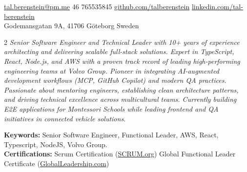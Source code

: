 \documentclass[10pt,a4paper]{article}
\begin{document}
\sloppy  %



\nobreakvspace{0.3em}  %

\noindent\href{mailto:tal.berenstein@pm.me}{tal.berenstein\mbox{}@\mbox{}pm.me}\sbull
\textsmaller{+}46 765535845\sbull
\href{https://github.com/talberenstein}{github.com/talberenstein}\sbull
\href{https://www.linkedin.com/in/tali-berenstein-torres-94055726b/}{linkedin.com/tal-berenstein}
\\
Godemansgatan 9A,
41706\thinspace {\large \sc }\sbull
Göteborg\sbull
Sweden

\spacedhrule{0.9em}{-0.4em}  %


\vspace{-1.3em}  %
\begin{multicols}{2}  %
\noindent
\emph{Senior Software Engineer and Technical Leader with 10+ years of experience architecting and delivering scalable full-stack solutions. Expert in TypeScript, React, Node.js, and AWS with a proven track record of leading high-performing engineering teams at Volvo Group. Pioneer in integrating AI-augmented development workflows (MCP, GitHub Copilot) and modern QA practices. Passionate about mentoring engineers, establishing clean architecture patterns, and driving technical excellence across multicultural teams. Currently building E2E applications for Montessori Schools while leading frontend and QA initiatives in connected vehicle solutions.}

\columnbreak

\end{multicols}

\noindent
\textbf{Keywords:}
Senior Software Engineer,
Functional Leader,
AWS,
React,
Typescript,
NodeJS,
Volvo Group.
\\
\textbf{Certifications:}
Scrum Certification (\href{https://scrum.org}{SCRUM.org})
Global Functional Leader Certificate (\href{https://globalleadership.com}{GlobalLeadership.com})
\end{document}
